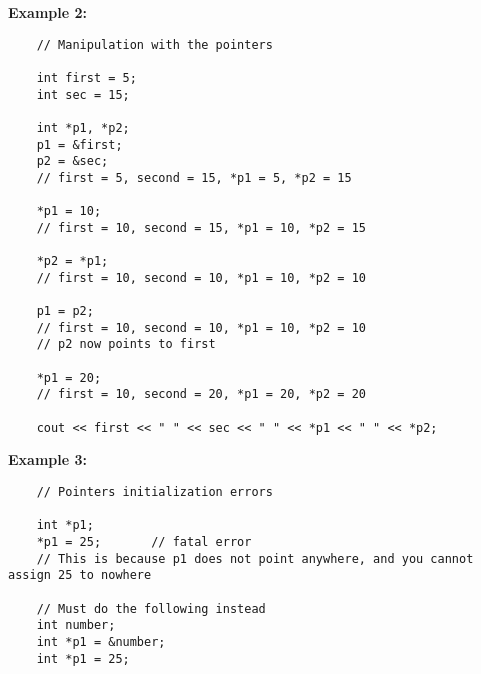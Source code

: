\documentclass[]{article}
\begin{document}
\textbf{Example 2:}

\begin{lstlisting}
	// Manipulation with the pointers
	
	int first = 5;
	int sec = 15;
	
	int *p1, *p2;
	p1 = &first;
	p2 = &sec;
	// first = 5, second = 15, *p1 = 5, *p2 = 15
	
	*p1 = 10;
	// first = 10, second = 15, *p1 = 10, *p2 = 15
	
	*p2 = *p1;
	// first = 10, second = 10, *p1 = 10, *p2 = 10
	
	p1 = p2;
	// first = 10, second = 10, *p1 = 10, *p2 = 10
	// p2 now points to first
	
	*p1 = 20;
	// first = 10, second = 20, *p1 = 20, *p2 = 20
	
	cout << first << " " << sec << " " << *p1 << " " << *p2;
\end{lstlisting}\bigbreak

\textbf{Example 3:}

\begin{lstlisting}
	// Pointers initialization errors
	
	int *p1;
	*p1 = 25; 		// fatal error
	// This is because p1 does not point anywhere, and you cannot assign 25 to nowhere
	
	// Must do the following instead
	int number; 
	int *p1 = &number;
	int *p1 = 25;
\end{lstlisting}\bigbreak
\end{document}
